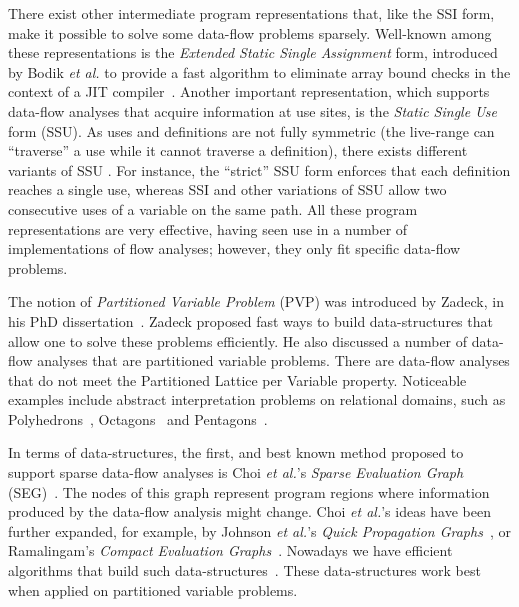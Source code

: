 {There exist other intermediate program representations that, like the SSI form, make it possible to solve some data-flow problems sparsely.
Well-known among these representations is the {\em Extended Static Single Assignment} form, introduced by Bodik {\em et al.} to provide a fast algorithm to eliminate array bound checks in the context of a JIT compiler~\cite{Bodik00}.
Another important representation, which supports data-flow analyses that acquire information at use sites, is the \emph{Static Single Use} form (SSU).
As uses and definitions are not fully symmetric (the live-range can ``traverse'' a use while it cannot traverse a definition), there exists different variants of SSU \cite{Plevyak96,George03-IXP,Lo98}.
For instance, the ``strict'' SSU form enforces that each definition reaches a
single use, whereas SSI and other variations of SSU allow two consecutive uses
of a variable on the same path.
All these program representations are very effective, having seen use in a number of implementations of flow analyses; however, they only fit specific data-flow problems.

The notion of {\em Partitioned Variable Problem} (PVP) was introduced by Zadeck, in his PhD dissertation~\cite{Zadeck84}.
Zadeck proposed fast ways to build data-structures that allow one to solve these problems efficiently.
He also discussed a number of data-flow analyses that are partitioned variable problems.
There are data-flow analyses that do not meet the Partitioned Lattice per Variable property.
Noticeable examples include abstract interpretation problems on relational domains, such as Polyhedrons~\cite{Cousot78}, Octagons~\cite{Mine06} and Pentagons~\cite{Logozzo08}.

In terms of data-structures, the first, and best known method proposed to support sparse data-flow analyses is Choi {\em et al.}'s {\em Sparse Evaluation Graph} (SEG)~\cite{Choi91}.
The nodes of this graph represent program regions where information produced by the data-flow analysis might change.
Choi {\em et al.}'s ideas have been further expanded, for example, by Johnson {\em et al.}'s {\em Quick Propagation Graphs}~\cite{Johnson93}, or Ramalingam's {\em Compact Evaluation Graphs}~\cite{Ramalingam02}.
Nowadays we have efficient algorithms that build such data-structures~\cite{Pingali95,Pingali97,Johnson94}.
These data-structures work best when applied on partitioned variable problems.

}
